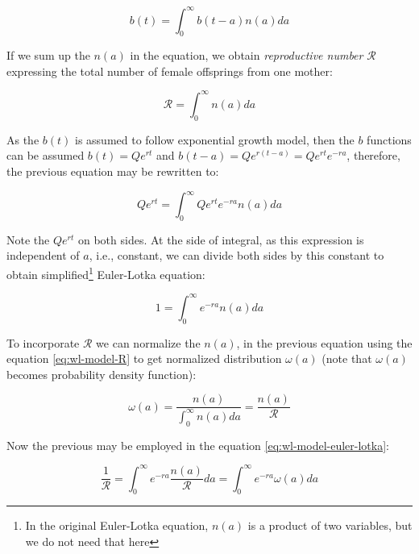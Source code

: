 \documentclass[
  digital, %
  oneside, %
  lof,     %
  lot,     %
]{fithesis4}
\begin{document}
\begin{equation}\label{eq:wl-model-renewal}
  b(t) = \int_{0}^{\infty} b(t - a) n(a) da
\end{equation}

If we sum up the $n(a)$ in the equation, we obtain \textit{reproductive number} 
$\mathcal{R}$ expressing the total number of female offsprings from one mother:

\begin{equation}\label{eq:wl-model-R}
  \mathcal{R} = \int_0^{\infty} n(a) da
\end{equation}

As the $b(t)$ is assumed to follow exponential growth model, then 
the $b$ functions can be assumed $b(t) = Q e^{rt}$ and 
$b(t - a) = Q e^{r(t - a)} = Q e^{rt} e^{-ra}$, therefore,
the previous equation may be rewritten to:

\begin{equation}
  Q e^{rt} = \int_{0}^{\infty} Q e^{rt} e^{-ra} n(a) da
\end{equation}

Note the $Q e^{rt}$ on both sides. At the side of integral, 
as this expression is independent of $a$, i.e., constant, we can 
divide both sides by this constant to obtain simplified\footnote{In the original Euler-Lotka equation, $n(a)$ is a product of two variables, but we do not need that here} Euler-Lotka equation:

\begin{equation}\label{eq:wl-model-euler-lotka}
  1 = \int_{0}^{\infty} e^{-ra} n(a) da
\end{equation}

To incorporate $\mathcal{R}$ we can normalize the $n(a)$, in the
previous equation using the equation \eqref{eq:wl-model-R} to get
normalized distribution $\omega(a)$ (note that $\omega(a)$ becomes 
probability density function):

\begin{equation}
  \omega(a) = \frac{n(a)}{\int_0^{\infty} n(a) da} = \frac{n(a)}{\mathcal{R}}
\end{equation}

\noindent
Now the previous may be employed in the equation \eqref{eq:wl-model-euler-lotka}:

\begin{equation}\label{eq:wl-model-euler-lotka-R}
  \frac{1}{\mathcal{R}} = \int_{0}^{\infty} e^{-ra} \frac{n(a)}{\mathcal{R}} da = \int_{0}^{\infty} e^{-ra} \omega(a) da
\end{equation}
\end{document}
